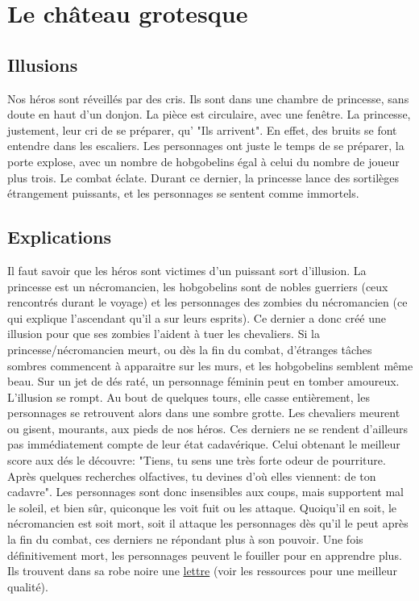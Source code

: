 \documentclass[a4paper]{article}
\begin{document}
\section{Le château grotesque}
\subsection{Illusions}
Nos héros sont réveillés par des cris. Ils sont dans une chambre de princesse, sans doute en haut d'un donjon. La pièce est circulaire, avec une fenêtre. La princesse, justement, leur cri de se préparer, qu' "Ils arrivent". En effet, des bruits se font entendre dans les escaliers. Les personnages ont juste le temps de se préparer, la porte explose, avec un nombre de hobgobelins égal à celui du nombre de joueur plus trois. Le combat éclate. Durant ce dernier, la princesse lance des sortilèges étrangement puissants, et les personnages se sentent comme immortels.

\subsection{Explications} 
Il faut savoir que les héros sont victimes d'un puissant sort d'illusion. La princesse est un nécromancien, les hobgobelins sont de nobles guerriers (ceux rencontrés durant le voyage) et les personnages des zombies du nécromancien (ce qui explique l'ascendant qu'il a sur leurs esprits). Ce dernier a donc créé une illusion pour que ses zombies l'aident à tuer les chevaliers. Si la princesse/nécromancien meurt, ou dès la fin du combat, d'étranges tâches sombres commencent à apparaitre sur les murs, et les hobgobelins semblent même beau. Sur un jet de dés raté, un personnage féminin peut en tomber amoureux. L'illusion se rompt. Au bout de quelques tours, elle casse entièrement, les personnages se retrouvent alors dans une sombre grotte.
\newline
Les chevaliers meurent ou gisent, mourants, aux pieds de nos héros. Ces derniers ne se rendent d’ailleurs pas immédiatement compte de leur état  cadavérique. Celui obtenant le meilleur score aux dés le découvre: "Tiens, tu sens une très forte odeur de pourriture. Après quelques recherches olfactives, tu devines d'où elles viennent: de ton cadavre". Les personnages sont donc insensibles aux coups, mais supportent mal le soleil, et bien sûr, quiconque les voit fuit ou les attaque.
\newline
Quoiqu'il en soit, le nécromancien est soit mort, soit il attaque les personnages dès qu'il le peut après la fin du combat, ces derniers ne répondant plus à son pouvoir. Une fois définitivement mort, les personnages peuvent le fouiller pour en apprendre plus. Ils trouvent dans sa robe noire une \hyperlink{lettre}{lettre} (voir les ressources pour une meilleur qualité).
\end{document}

